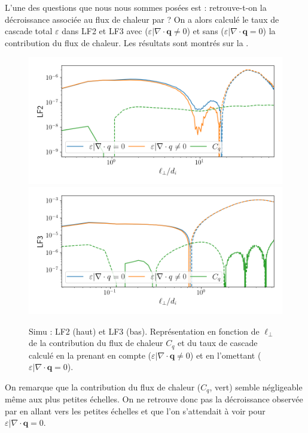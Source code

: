 L'une des questions que nous nous sommes posées est : retrouve-t-on la décroissance associée au flux de chaleur par \cite{ferrand_fluid_2021} ? On a alors calculé le taux de cascade total $\varepsilon$ dans LF2 et LF3 avec ($\varepsilon|\nabla \cdot \boldsymbol{q} \neq 0$) et sans ($\varepsilon|\nabla \cdot \boldsymbol{q} = 0$) la contribution du flux de chaleur. Les résultats sont montrés sur la .
\begin{figure}[!ht]
 \centering
\includegraphics[width=0.9\linewidth,trim=1cm 1cm 0cm 1cm, clip=true]{./Mainmatter/Part_3/images_ch4/LF2_q}
\includegraphics[width=0.9\linewidth,trim=1cm 1cm 0cm 1cm, clip=true]{./Mainmatter/Part_3/images_ch4/LF3_q}
\cprotect\caption{Simu : LF2 (haut) et LF3 (bas). Représentation  en fonction de \ensuremath{\ell_{\perp}} de la contribution du flux de chaleur \ensuremath{C_q} et du taux de cascade calculé en la prenant en compte (\ensuremath{\varepsilon|\nabla \cdot \boldsymbol{q} \neq 0}) et en l'omettant (\ensuremath{\varepsilon|\nabla \cdot \boldsymbol{q} = 0}).}
\label{fig:LF_q}
\end{figure} 

On remarque que la contribution du flux de chaleur ($C_q$, vert) semble négligeable même aux plus petites échelles. On ne retrouve donc pas la décroissance observée par \cite{ferrand_fluid_2021} en allant vers les petites échelles et que l'on s'attendait à voir pour $\varepsilon|\nabla \cdot \boldsymbol{q} = 0$.

